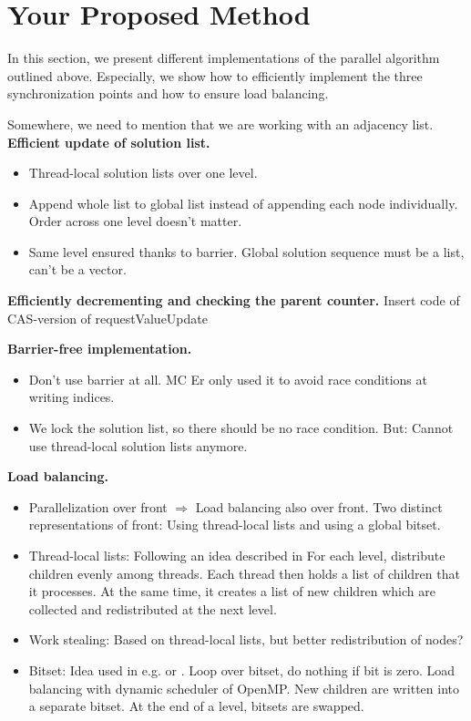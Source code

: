 \documentclass[letterpaper]{article}
\newcommand{\mypar}[1]{{\bf #1.}}
\begin{document}
\section{Your Proposed Method}\label{sec:yourmethod}
In this section, we present different implementations of the parallel algorithm outlined above.
Especially, we show how to efficiently implement the three synchronization points and how to ensure load balancing.

\begin{invisible}
Somewhere, we need to mention that we are working with an adjacency list.
 \mypar{Efficient update of solution list} %
 \begin{itemize}
  \item Thread-local solution lists over one level.
  \item Append whole list to global list instead of appending each node individually. Order across one level doesn't matter.
  \item Same level ensured thanks to barrier. Global solution sequence must be a list, can't be a vector.
 \end{itemize}

 \mypar{Efficiently decrementing and checking the parent counter} %
 Insert code of CAS-version of requestValueUpdate
 
 \mypar{Barrier-free implementation} %
 \begin{itemize}
  \item Don't use barrier at all. MC Er only used it to avoid race conditions at writing indices.
  \item We lock the solution list, so there should be no race condition. But: Cannot use thread-local solution lists anymore.
 \end{itemize}

 \mypar{Load balancing}
 \begin{itemize}
  \item Parallelization over front $\Rightarrow$ Load balancing also over front. Two distinct representations of front: Using thread-local lists and using a global bitset.
  \item Thread-local lists: Following an idea described in \cite{bulucc2011parallel} %
  For each level, distribute children evenly among threads. Each thread then holds a list of children that it processes.
  At the same time, it creates a list of new children which are collected and redistributed at the next level.
  \item Work stealing: Based on thread-local lists, but better redistribution of nodes?
  \item Bitset: Idea used in e.g. \cite{agarwal2010scalable} or \cite{beamer2013direction}. Loop over bitset, do nothing if bit is zero. Load balancing with dynamic scheduler of OpenMP.
  New children are written into a separate bitset. At the end of a level, bitsets are swapped.
 \end{itemize}


\end{invisible}
\end{document}
